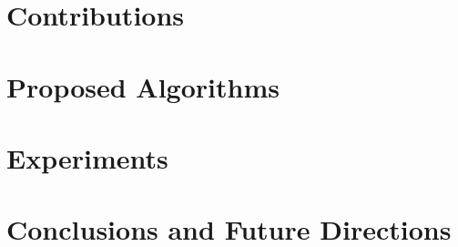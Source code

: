 \documentclass[letterpaper]{article} %
\begin{document}
\section{Contributions}


\section{Proposed Algorithms}


\section{Experiments}




\section{Conclusions and Future Directions}




\newpage


\end{document}
